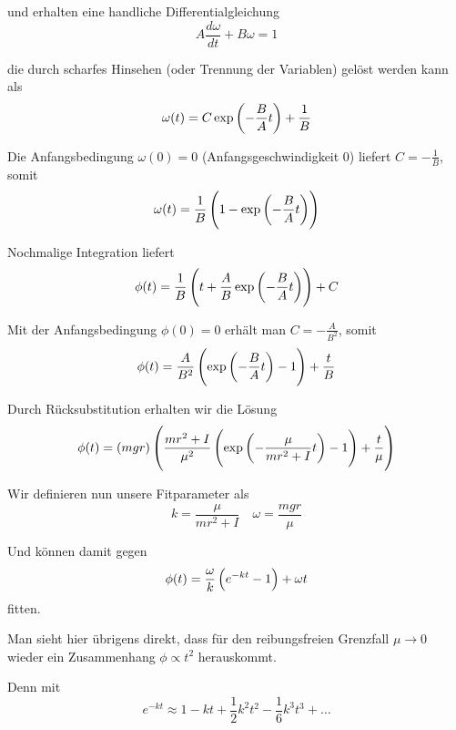 \documentclass[a4paper,german,12pt,smallheadings]{scrartcl}
\begin{document}
und erhalten eine handliche Differentialgleichung
\begin{equation}
  A \frac{d \omega}{dt} + B \omega = 1
\end{equation}

die durch scharfes Hinsehen (oder Trennung der Variablen) gelöst werden kann als
\begin{equation}
  \omega(t) = C \exp\del{- \frac{B}{A} t} + \frac{1}{B}
\end{equation}

Die Anfangsbedingung $\omega(0) = 0$ (Anfangsgeschwindigkeit 0) liefert $C =
-\frac{1}{B}$, somit
\begin{equation}
  \omega(t) = \frac{1}{B} \del{1 - \exp\del{-\frac{B}{A} t}}
\end{equation}

Nochmalige Integration liefert
\begin{equation}
  \phi(t) = \frac{1}{B} \del{t + \frac{A}{B} \exp\del{-\frac{B}{A} t}} + C
\end{equation}

Mit der Anfangsbedingung $\phi(0) = 0$ erhält man $C = -\frac{A}{B^2}$, somit
\begin{equation}
  \phi(t) = \frac{A}{B^2} \del{ \exp\del{-\frac{B}{A} t} - 1} + \frac{t}{B}
\end{equation}

Durch Rücksubstitution erhalten wir die Lösung
\begin{equation}
  \phi(t)
  = \del{mgr}
  \del{
    \frac{mr^2+I}{\mu^2}
    \del{
      \exp\del{-\frac{\mu}{mr^2 + I} t} - 1
  } + \frac{t}{\mu}}
\end{equation}

Wir definieren nun unsere Fitparameter als
\begin{equation}
  k = \frac{\mu}{mr^2 + I} \quad
  \omega = \frac{mgr}{\mu}
\end{equation}

Und können damit gegen
\begin{equation}
  \phi(t) = \frac{\omega}{k} \del{e^{-kt} - 1} + \omega t
\end{equation}
fitten.

Man sieht hier übrigens direkt, dass für den reibungsfreien Grenzfall $\mu \to
0$ wieder ein Zusammenhang $\phi \propto t^2$ herauskommt.

Denn mit
\begin{equation}
  e^{-kt} \approx 1 - kt + \frac{1}{2} k^2 t^2 - \frac{1}{6} k^3t^3 + \dots
\end{equation}
\end{document}
